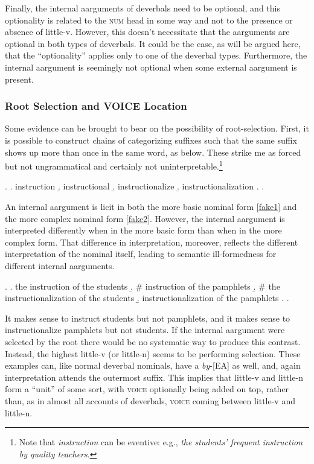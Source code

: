 \documentclass[12pt]{article}
\begin{document}
Finally, the internal aarguments of deverbals need to be optional, and this optionality is related to the \textsc{num} head in some way and not to the presence or absence of little-v. However, this doesn't necessitate that the aarguments are optional in both types of deverbals. It could be the case, as will be argued here, that the ``optionality'' applies only to one of the deverbal types. Furthermore, the internal aargument is seemingly not optional when some external aargument is present.

\subsubsection{Root Selection and VOICE Location}\label{disc2.1}

Some evidence can be brought to bear on the possibility of root-selection. First, it is possible to construct chains of categorizing suffixes such that the same suffix shows up more than once in the same word, as below. These strike me as forced but not ungrammatical and certainly not uninterpretable.\footnote{ Note that \textit{instruction} can be eventive: e.g., \textit{the students' frequent instruction by quality teachers}.}

\singlespacing

\ex. 
\a. \label{fake1} instruction
\b. instructional
\b. instructionalize
\b. \label{fake2} instructionalization
\z. \z. \par


\doublespacing

\noindent An internal aargument is licit in both the more basic nominal form \ref{fake1} and the more complex nominal form \ref{fake2}. However, the internal aargument is interpreted differently when in the more basic form than when in the more complex form. That difference in interpretation, moreover, reflects the different interpretation of the nominal itself, leading to semantic ill-formedness for different internal aarguments.

\singlespacing

\ex. 
\a. the instruction of the students
\b. \# instruction of the pamphlets
\b. \# the instructionalization of the students
\b. instructionalization of the pamphlets
\z. \z. \par

\doublespacing

It makes sense to instruct students but not pamphlets, and it makes sense to instructionalize pamphlets but not students. If the internal aargument were selected by the root there would be no systematic way to produce this contrast. Instead, the highest little-v (or little-n) seems to be performing selection. These examples can, like normal deverbal nominals, have a \textit{by}-[EA] as well, and, again interpretation attends the outermost suffix. This implies that little-v and little-n form a ``unit'' of some sort, with \textsc{voice} optionally being added on top, rather than, as in almost all accounts of deverbals, \textsc{voice} coming between little-v and little-n. 
\end{document}
